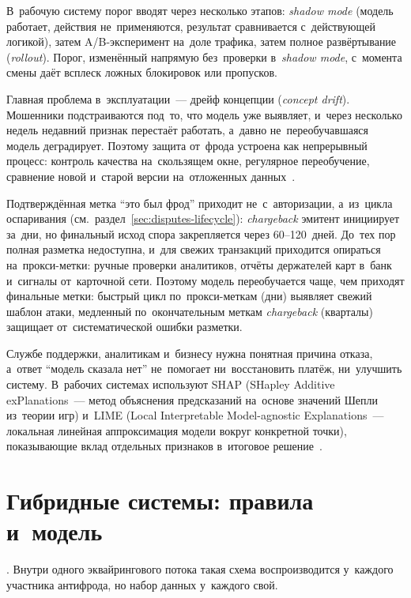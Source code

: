 В~рабочую систему порог вводят через несколько этапов: \textit{shadow mode}
(модель работает, действия не~применяются, результат сравнивается
с~действующей логикой), затем A/B-эксперимент на~доле трафика, затем полное
развёртывание (\textit{rollout}). Порог, изменённый напрямую без~проверки
в~\textit{shadow mode}, с~момента смены даёт всплеск ложных блокировок или
пропусков.

Главная проблема в~эксплуатации~--- дрейф концепции (\textit{concept drift}).
Мошенники подстраиваются под~то, что модель уже выявляет, и~через несколько
недель недавний признак перестаёт работать, а~давно не~переобучавшаяся модель
деградирует. Поэтому защита от~фрода устроена как непрерывный процесс: контроль
качества на~скользящем окне, регулярное
переобучение, сравнение новой и~старой версии на~отложенных
данных~\cite{concept-drift-survey-2014}.

Подтверждённая метка \enquote{это был фрод} приходит не~с~авторизации,
а~из~цикла оспаривания (см.~раздел~\ref{sec:disputes-lifecycle}):
\textit{chargeback} эмитент инициирует за~дни, но финальный исход спора
закрепляется через 60--120~дней. До~тех пор полная разметка недоступна, и~для
свежих транзакций приходится опираться на~прокси-метки: ручные проверки
аналитиков, отчёты держателей карт в~банк и~сигналы от~карточной сети. Поэтому
модель переобучается чаще, чем приходят финальные метки: быстрый цикл
по~прокси-меткам (дни) выявляет свежий шаблон атаки, медленный по~окончательным
меткам \textit{chargeback} (кварталы) защищает от~систематической ошибки
разметки.

Службе поддержки, аналитикам и~бизнесу нужна понятная причина отказа,
а~ответ \enquote{модель сказала нет} не~помогает ни~восстановить платёж,
ни~улучшить систему. В~рабочих системах используют SHAP (SHapley Additive
  exPlanations~--- метод объяснения предсказаний на~основе значений Шепли
из~теории игр) и~LIME (Local Interpretable Model-agnostic Explanations~---
локальная линейная аппроксимация модели вокруг конкретной точки), показывающие
вклад отдельных признаков в~итоговое решение~\cite{lime-2016,shap-2017}.

\section{Гибридные системы: правила и~модель}\label{sec:fraud-hybrid}

. Внутри одного
эквайрингового потока такая схема воспроизводится у~каждого участника антифрода,
но набор данных у~каждого свой.

